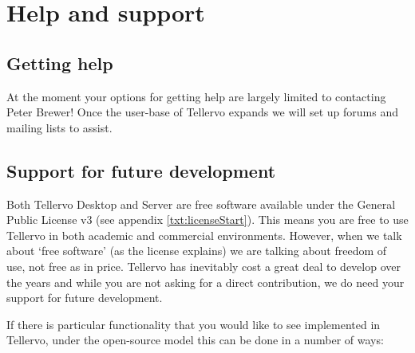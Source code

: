 \chapter{Help and support}


\section{Getting help}

At the moment your options for getting help are largely limited to contacting Peter Brewer!  Once the user-base of Tellervo expands we will set up forums and mailing lists to assist.


\section{Support for future development}
Both Tellervo Desktop and Server are free software available under the General Public License v3 (see appendix \ref{txt:licenseStart}).  This means you are free to use Tellervo in both academic and commercial environments.  However, when we talk about `free software' (as the license explains) we are talking about freedom of use, not free as in price.  Tellervo has inevitably cost a great deal to develop over the years and while you are not asking for a direct contribution, we do need your support for future development.

If there is particular functionality that you would like to see implemented in Tellervo, under the open-source model this can be done in a number of ways:

